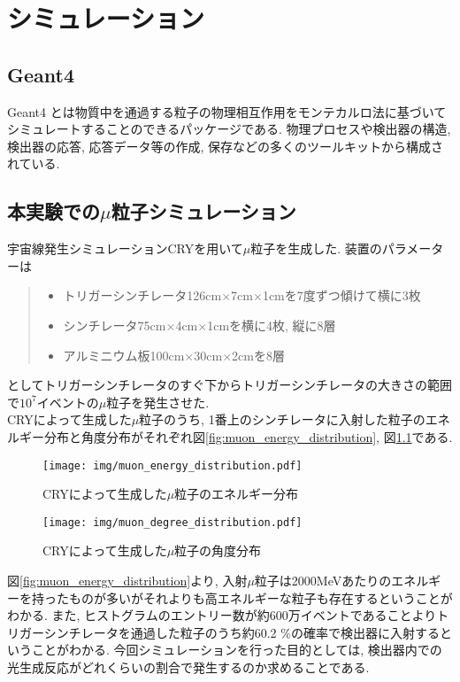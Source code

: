 \chapter{シミュレーション}\label{simulation}
\section{Geant4}
Geant4 とは物質中を通過する粒子の物理相互作用をモンテカルロ法に基づいてシミュレートすることのできるパッケージである.
物理プロセスや検出器の構造, 検出器の応答, 応答データ等の作成, 保存などの多くのツールキットから構成されている.

\section{本実験での$\mu$粒子シミュレーション}
宇宙線発生シミュレーションCRYを用いて$\mu$粒子を生成した.
装置のパラメーターは
\begin{quote}
    \begin{itemize}
        \item トリガーシンチレータ126cm$\times$7cm$\times$1cmを7度ずつ傾けて横に3枚
        \item シンチレータ75cm$\times$4cm$\times$1cmを横に4枚, 縦に8層
        \item アルミニウム板100cm$\times$30cm$\times$2cmを8層
    \end{itemize}
\end{quote}
としてトリガーシンチレータのすぐ下からトリガーシンチレータの大きさの範囲で$10^{7}$イベントの$\mu$粒子を発生させた.
\\
CRYによって生成した$\mu$粒子のうち, 
1番上のシンチレータに入射した粒子のエネルギー分布と角度分布がそれぞれ図\ref{fig:muon_energy_distribution}, 図\ref{fig:muon_degree_distribution}である.
\begin{figure}[H]
    \begin{minipage}[b]{0.47\linewidth}
        \centering
        \texttt{[image: img/muon\_energy\_distribution.pdf]}
        \caption{CRYによって生成した$\mu$粒子のエネルギー分布}
        \label{fig:muon_energy_distribution}
    \end{minipage}
    \begin{minipage}[b]{0.47\linewidth}
        \centering
        \texttt{[image: img/muon\_degree\_distribution.pdf]}
        \caption{CRYによって生成した$\mu$粒子の角度分布}
        \label{fig:muon_degree_distribution}
    \end{minipage}
\end{figure}
図\ref{fig:muon_energy_distribution}より, 入射$\mu$粒子は2000MeVあたりのエネルギーを持ったものが多いがそれよりも高エネルギーな粒子も存在するということがわかる.
また, ヒストグラムのエントリー数が約600万イベントであることよりトリガーシンチレータを通過した粒子のうち約60.2 $\%$の確率で検出器に入射するということがわかる.
今回シミュレーションを行った目的としては, 検出器内での光生成反応がどれくらいの割合で発生するのか求めることである.

